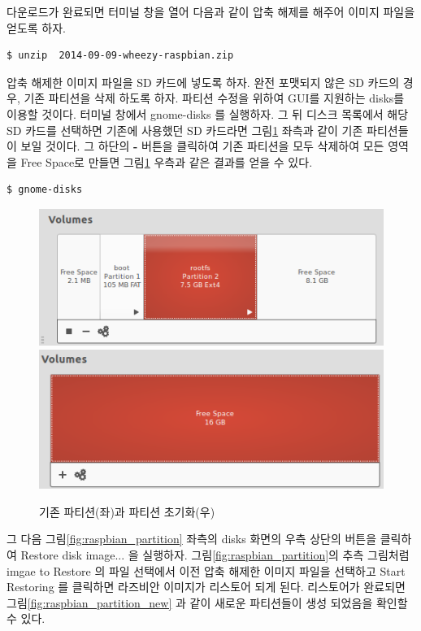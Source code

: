 \newpage

\noindent
다운로드가 완료되면 터미널 창을 열어 다음과 같이 압축 해제를 해주어 이미지 파일을 얻도록 하자.

\vspace{\baselineskip}
\begin{lstlisting}[language=ROS]
$ unzip  2014-09-09-wheezy-raspbian.zip
\end{lstlisting}

\noindent
압축 해제한 이미지 파일을 SD 카드에 넣도록 하자. 완전 포맷되지 않은 SD 카드의 경우, 기존 파티션을 삭제 하도록 하자. 파티션 수정을 위하여 GUI를 지원하는 disks를 이용할 것이다. 터미널 창에서 gnome-disks 를 실행하자. 그 뒤 디스크 목록에서 해당 SD 카드를 선택하면 기존에 사용했던 SD 카드라면 그림\ref{fig:partition_init1} 좌측과 같이 기존 파티션들이 보일 것이다. 그 하단의 \textbf{-} 버튼을 클릭하여 기존 파티션을 모두 삭제하여 모든 영역을 Free Space로 만들면 그림\ref{fig:partition_init1} 우측과 같은 결과를 얻을 수 있다.

\vspace{\baselineskip}
\begin{lstlisting}[language=ROS]
$ gnome-disks
\end{lstlisting}

\begin{figure}[h]
\centering
\includegraphics[width=0.49\columnwidth]{pictures/chapter3/odroid_partition1.png}
\includegraphics[width=0.48\columnwidth]{pictures/chapter3/odroid_partition2.png}
\caption{기존 파티션(좌)과 파티션 초기화(우)}
\label{fig:partition_init1}
\end{figure}

\noindent
그 다음 그림\ref{fig:raspbian_partition} 좌측의 disks 화면의 우측 상단의 버튼을 클릭하여 Restore disk image... 을 실행하자. 그림\ref{fig:raspbian_partition}의 추측 그림처럼 imgae to Restore 의 파일 선택에서 이전 압축 해제한 이미지 파일을 선택하고 Start Restoring 를 클릭하면 라즈비안 이미지가 리스토어 되게 된다. 리스토어가 완료되면 그림\ref{fig:raspbian_partition_new} 과 같이 새로운 파티션들이 생성 되었음을 확인할 수 있다.

